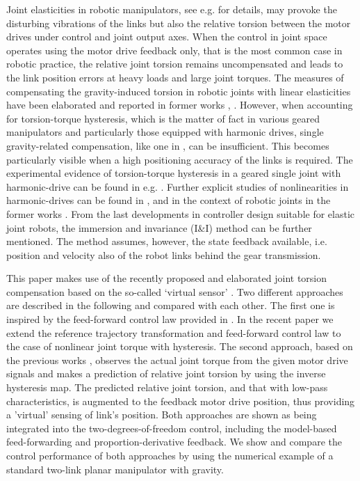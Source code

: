 \documentclass[a4paper, 10pt, conference]{ieeeconf}
\begin{document}
Joint elasticities in robotic manipulators, see e.g.
\cite{Readman1994,spong2006,Sicil2009} for details, may provoke
the disturbing vibrations of the links but also the relative
torsion between the motor drives under control and joint output
axes. When the control in joint space operates using the motor
drive feedback only, that is the most common case in robotic
practice, the relative joint torsion remains uncompensated and
leads to the link position errors at heavy loads and large joint
torques. The measures of compensating the gravity-induced torsion
in robotic joints with linear elasticities have been elaborated
and reported in former works \cite{Tomei91}, \cite{spong87}.
However, when accounting for torsion-torque hysteresis, which is
the matter of fact in various geared manipulators and particularly
those equipped with harmonic drives, single gravity-related
compensation, like one in \cite{DeLucaEtAl05}, can be
insufficient. This becomes particularly visible when a high
positioning accuracy of the links is required. The experimental
evidence of torsion-torque hysteresis in a geared single joint
with harmonic-drive can be found in e.g.
\cite{Ruderman2014b,Ruderman2014c}. Further explicit studies of
nonlinearities in harmonic-drives can be found in
\cite{tuttle1996,taghirad98,Ghorbel2001,dhaouadi03}, and in the
context of robotic joints in the former works
\cite{Kircanski94,Seyfferth95}. From the last developments in
controller design suitable for elastic joint robots, the immersion
and invariance (I\&I) method \cite{Astolfi2007} can be further
mentioned. The method assumes, however, the state feedback
available, i.e. position and velocity also of the robot links
behind the gear transmission.

This paper makes use of the recently proposed and elaborated joint
torsion compensation based on the so-called `virtual sensor'
\cite{Ruderman2014b,Ruderman2014c,Ruderman2015,Ruderman2015Last}.
Two different approaches are described in the following and
compared with each other. The first one is inspired by the
feed-forward control law provided in \cite{DeLuca00}. In the
recent paper we extend the reference trajectory transformation and
feed-forward control law to the case of nonlinear joint torque
with hysteresis. The second approach, based on the previous works
\cite{Ruderman2014b,Ruderman2014c,Ruderman2015}, observes the
actual joint torque from the given motor drive signals and makes a
prediction of relative joint torsion by using the inverse
hysteresis map. The predicted relative joint torsion, and that
with low-pass characteristics, is augmented to the feedback motor
drive position, thus providing a 'virtual' sensing of link's
position. Both approaches are shown as being integrated into the
two-degrees-of-freedom control, including the model-based
feed-forwarding and proportion-derivative feedback. We show and
compare the control performance of both approaches by using the
numerical example of a standard two-link planar manipulator with
gravity.
\end{document}

